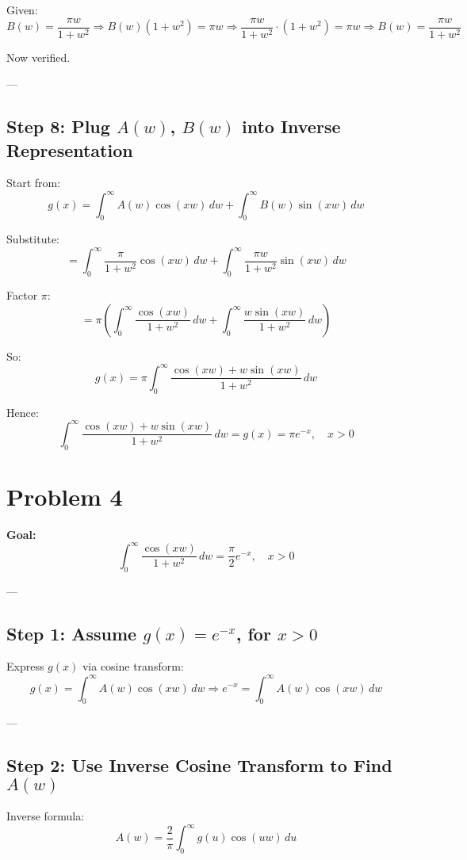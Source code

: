 \documentclass{article}
\begin{document}
Given:
\[
B(w) = \frac{\pi w}{1 + w^2}
\Rightarrow B(w)(1 + w^2) = \pi w
\Rightarrow \frac{\pi w}{1 + w^2} \cdot (1 + w^2) = \pi w
\Rightarrow B(w) = \frac{\pi w}{1 + w^2}
\]

Now verified.

---

\subsection*{Step 8: Plug \( A(w) \), \( B(w) \) into Inverse Representation}

Start from:
\[
g(x) = \int_0^\infty A(w) \cos(xw) \, dw + \int_0^\infty B(w) \sin(xw) \, dw
\]

Substitute:
\[
= \int_0^\infty \frac{\pi}{1 + w^2} \cos(xw) \, dw + \int_0^\infty \frac{\pi w}{1 + w^2} \sin(xw) \, dw
\]

Factor \( \pi \):
\[
= \pi \left( \int_0^\infty \frac{\cos(xw)}{1 + w^2} \, dw + \int_0^\infty \frac{w \sin(xw)}{1 + w^2} \, dw \right)
\]

So:
\[
g(x) = \pi \int_0^\infty \frac{\cos(xw) + w \sin(xw)}{1 + w^2} \, dw
\]

Hence:
\[
\boxed{
\int_0^\infty \frac{\cos(xw) + w \sin(xw)}{1 + w^2} \, dw = g(x) = \pi e^{-x}, \quad x > 0
}
\]

\newpage
\section*{Problem 4}

\textbf{Goal:}
\[
\boxed{
\int_0^\infty \frac{\cos(xw)}{1 + w^2} \, dw = \frac{\pi}{2} e^{-x}, \quad x > 0
}
\]

---

\subsection*{Step 1: Assume \( g(x) = e^{-x} \), for \( x > 0 \)}

Express \( g(x) \) via cosine transform:
\[
g(x) = \int_0^\infty A(w) \cos(xw) \, dw
\Rightarrow
e^{-x} = \int_0^\infty A(w) \cos(xw) \, dw
\]

---

\subsection*{Step 2: Use Inverse Cosine Transform to Find \( A(w) \)}

Inverse formula:
\[
A(w) = \frac{2}{\pi} \int_0^\infty g(u) \cos(uw) \, du
\]
\end{document}
